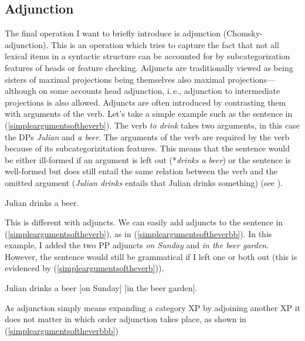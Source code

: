 \subsection{Adjunction}\label{generaladjunction}
The final operation I want to briefly introduce is adjunction (Chomsky-adjunction). This is an operation which tries to capture the fact that not all lexical items in a syntactic structure can be accounted for by subcategorization features of heads or feature checking. Adjuncts are traditionally viewed as being sisters of maximal projections being themselves also maximal projections---although on some accounts head adjunction, i.\,e., adjunction to intermediate projections is also allowed. Adjuncts are often introduced by contrasting them with arguments of the verb. Let's take a simple example such as the sentence in (\ref{simpleargumentsoftheverb}). The verb \textit{to drink} takes two arguments, in this case the DPs \textit{Julian} and \textit{a beer}. The arguments of the verb are required by the verb because of its subcategorizitation features. This means that the sentence would be either ill-formed if an argument is left out (*\textit{drinks a beer}) or the sentence is well-formed but does still entail the same relation between the verb and the omitted argument (\textit{Julian drinks} entails that Julian drinks something) (see \citealt{hole2015arguments}).

\begin{exe}
\ex\label{simpleargumentsoftheverb} Julian drinks a beer.
\end{exe}

\noindent This is different with adjuncts. We can easily add adjuncts to the sentence in (\ref{simpleargumentsoftheverb}), as in (\ref{simpleargumentsoftheverbb}). In this example, I added the two PP adjuncts \textit{on Sunday} and \textit{in the beer garden}. However, the sentence would still be grammatical if I left one or both out (this is evidenced by (\ref{simpleargumentsoftheverb})). 

\begin{exe}
\ex\label{simpleargumentsoftheverbb} Julian drinks a beer $[$on Sunday$]$ $[$in the beer garden$]$.
\end{exe}

\noindent As adjunction simply means expanding a category XP by adjoining another XP it does not matter in which order adjunction takes place, as shown in (\ref{simpleargumentsoftheverbbb})

